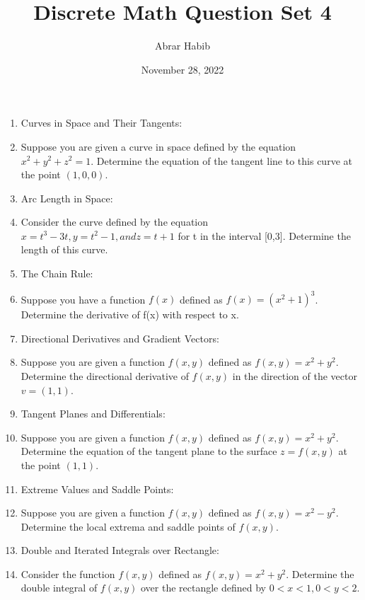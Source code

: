 \documentclass[letterpaper,11pt]{article}
\begin{document}
\title{Discrete Math Question Set 4}
\author{Abrar Habib}
\date{November 28, 2022}
\maketitle

\begin{enumerate}
    
    \item Curves in Space and Their Tangents:  
    \item[] Suppose you are given a curve in space defined by the equation $x^2 + y^2 + z^2 = 1$. Determine the equation of the tangent line to this curve at the point $(1,0,0)$.
    
    \item Arc Length in Space:
    \item[] Consider the curve defined by the equation $x = t^3 - 3t, y = t^2 - 1, and z = t + 1$ for t in the interval [0,3]. Determine the length of this curve.
    
    \item The Chain Rule:
    \item[] Suppose you have a function $f(x)$ defined as $f(x) = (x^2 + 1)^3$. Determine the derivative of f(x) with respect to x.

    \item Directional Derivatives and Gradient Vectors:
    \item[] Suppose you are given a function $f(x,y)$ defined as $f(x,y) = x^2 + y^2$. Determine the directional derivative of $f(x,y)$ in the direction of the vector $v = (1,1)$.

    \item Tangent Planes and Differentials:
    \item[] Suppose you are given a function $f(x,y)$ defined as $f(x,y) = x^2 + y^2$. Determine the equation of the tangent plane to the surface $z = f(x,y)$ at the point $(1,1)$.

    \item Extreme Values and Saddle Points:
    \item[] Suppose you are given a function $f(x,y)$ defined as $f(x,y) = x^2 - y^2$. Determine the local extrema and saddle points of $f(x,y)$.

    \item Double and Iterated Integrals over Rectangle:
    \item[] Consider the function $f(x,y)$ defined as $f(x,y) = x^2 + y^2$. Determine the double integral of $f(x,y)$ over the rectangle defined by $0 < x < 1, 0 < y < 2$.


\end{enumerate}
\end{document}
